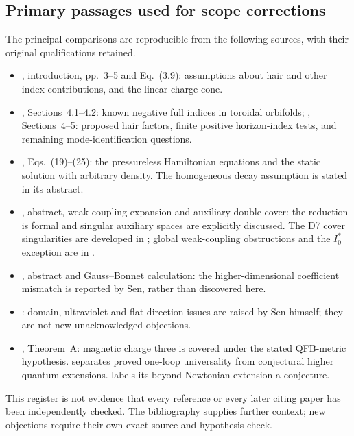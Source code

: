 \subsection{Primary passages used for scope corrections}
The principal comparisons are reproducible from the following sources, with their original qualifications retained.
\begin{itemize}[leftmargin=1.4em,itemsep=2pt]
\item \cite{Sen11positivity}, introduction, pp.~3--5 and Eq.~(3.9): assumptions about hair and other index contributions, and the linear charge cone.
\item \cite{CD19}, Sections~4.1--4.2: known negative full indices in toroidal orbifolds; \cite{CD21}, Sections~4--5: proposed hair factors, finite positive horizon-index tests, and remaining mode-identification questions.
\item \cite{Sen02field}, Eqs.~(19)--(25): the pressureless Hamiltonian equations and the static solution with arbitrary density. The homogeneous decay assumption is stated in its abstract.
\item \cite{Sen97orientifold}, abstract, weak-coupling expansion and auxiliary double cover: the reduction is formal and singular auxiliary spaces are explicitly discussed. The D7 cover singularities are developed in \cite{CDE09}; global weak-coupling obstructions and the $I_0^*$ exception are in \cite{HLS18}.
\item \cite{Sen05stretching}, abstract and Gauss--Bonnet calculation: the higher-dimensional coefficient mismatch is reported by Sen, rather than discovered here.
\item \cite{Sen23localisation}: domain, ultraviolet and flat-direction issues are raised by Sen himself; they are not new unacknowledged objections.
\item \cite{KottkeRochon24}, Theorem~A: magnetic charge three is covered under the stated QFB-metric hypothesis. \cite{KrishnaSahoo23} separates proved one-loop universality from conjectural higher quantum extensions. \cite{KKMSS26} labels its beyond-Newtonian extension a conjecture.
\end{itemize}
This register is not evidence that every reference or every later citing paper has been independently checked. The bibliography supplies further context; new objections require their own exact source and hypothesis check.

